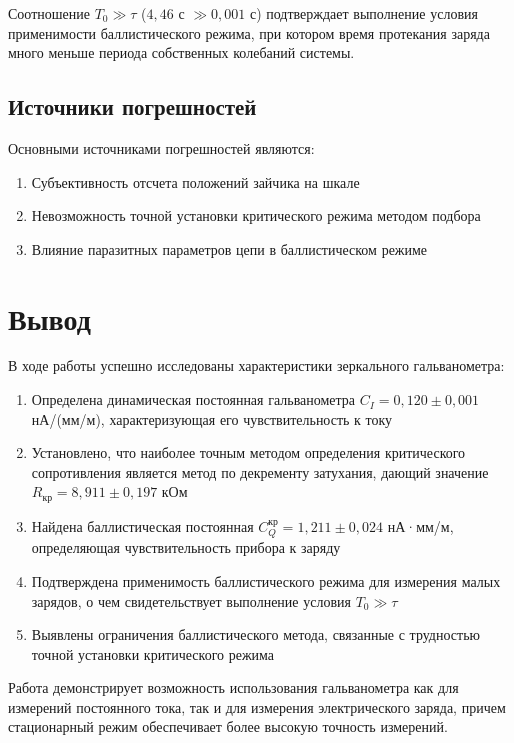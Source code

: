 \documentclass[a4paper]{article}
\begin{document}
Соотношение $T_0 \gg \tau$ ($4,46$ с $\gg 0,001$ с) подтверждает выполнение условия применимости баллистического режима, при котором время протекания заряда много меньше периода собственных колебаний системы.

\subsection{Источники погрешностей}
Основными источниками погрешностей являются:
\begin{enumerate}
    \item Субъективность отсчета положений зайчика на шкале
    \item Невозможность точной установки критического режима методом подбора
    \item Влияние паразитных параметров цепи в баллистическом режиме
\end{enumerate}

\section{Вывод}

В ходе работы успешно исследованы характеристики зеркального гальванометра:
\begin{enumerate}
    \item Определена динамическая постоянная гальванометра $C_I = 0,120 \pm 0,001$ нА/(мм/м), характеризующая его чувствительность к току
    
    \item Установлено, что наиболее точным методом определения критического сопротивления является метод по декременту затухания, дающий значение $R_{\text{кр}} = 8,911 \pm 0,197$ кОм
    
    \item Найдена баллистическая постоянная $C_Q^{\text{кр}} = 1,211 \pm 0,024$ нА·мм/м, определяющая чувствительность прибора к заряду
    
    \item Подтверждена применимость баллистического режима для измерения малых зарядов, о чем свидетельствует выполнение условия $T_0 \gg \tau$
    
    \item Выявлены ограничения баллистического метода, связанные с трудностью точной установки критического режима
\end{enumerate}

Работа демонстрирует возможность использования гальванометра как для измерений постоянного тока, так и для измерения электрического заряда, причем стационарный режим обеспечивает более высокую точность измерений.
\end{document}
